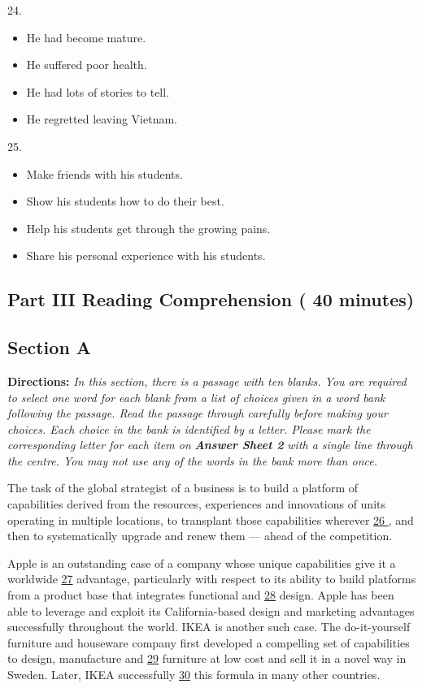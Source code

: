 \documentclass[UTF8,11pt]{ctexart}
\begin{document}
24.


\begin{itemize}[leftmargin=2em,itemsep=.2em,topsep=.4em]\item[A.] He had become mature.
\item[B.] He suffered poor health.
\item[C.] He had lots of stories to tell.
\item[D.] He regretted leaving Vietnam.
\end{itemize}

25.


\begin{itemize}[leftmargin=2em,itemsep=.2em,topsep=.4em]\item[A.] Make friends with his students.
\item[B.] Show his students how to do their best.
\item[C.] Help his students get through the growing pains.
\item[D.] Share his personal experience with his students.
\end{itemize}

\subsection*{\textbf{Part III Reading Comprehension ( 40 minutes)}}


\subsection*{\textbf{Section A}}


\textbf{Directions:} \textit{In this section, there is a passage with ten blanks. You are required to select one word for each blank} \textit{from a list of choices given in a word bank following the passage. Read the passage through carefully before making} \textit{your choices. Each choice in the bank is identified by a letter. Please mark the corresponding letter for each item on} \textbf{\textit{Answer Sheet 2}}\textit{ with a single line through the centre. You may not use any of the words in the bank more than once.}


The task of the global strategist of a business is to build a platform of capabilities derived from the resources, experiences and innovations of units operating in multiple locations, to transplant those capabilities wherever \uline{26 }, and then to systematically upgrade and renew them — ahead of the competition.


Apple is an outstanding case of a company whose unique capabilities give it a worldwide \uline{27} advantage, particularly with respect to its ability to build platforms from a product base that integrates functional and \uline{28} design. Apple has been able to leverage and exploit its California-based design and marketing advantages successfully throughout the world. IKEA is another such case. The do-it-yourself furniture and houseware company first developed a compelling set of capabilities to design, manufacture and \uline{29} furniture at low cost and sell it in a novel way in Sweden. Later, IKEA successfully \uline{30} this formula in many other countries.
\end{document}
